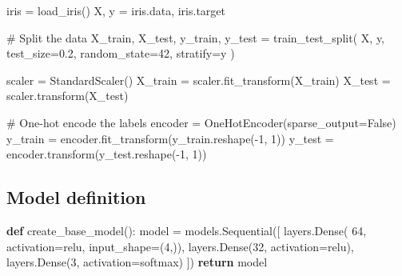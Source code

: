 \documentclass[
]{IEEEtran}
\newenvironment{Shaded}{\begin{snugshade}}{\end{snugshade}}
\newcommand{\CommentTok}[1]{\textcolor[rgb]{0.37,0.37,0.37}{#1}}
\newcommand{\ControlFlowTok}[1]{\textcolor[rgb]{0.00,0.23,0.31}{\textbf{#1}}}
\newcommand{\DecValTok}[1]{\textcolor[rgb]{0.68,0.00,0.00}{#1}}
\newcommand{\FloatTok}[1]{\textcolor[rgb]{0.68,0.00,0.00}{#1}}
\newcommand{\KeywordTok}[1]{\textcolor[rgb]{0.00,0.23,0.31}{\textbf{#1}}}
\newcommand{\NormalTok}[1]{\textcolor[rgb]{0.00,0.23,0.31}{#1}}
\newcommand{\OperatorTok}[1]{\textcolor[rgb]{0.37,0.37,0.37}{#1}}
\newcommand{\StringTok}[1]{\textcolor[rgb]{0.13,0.47,0.30}{#1}}
\newcommand{\VariableTok}[1]{\textcolor[rgb]{0.07,0.07,0.07}{#1}}
\begin{document}
\begin{Shaded}
\begin{Highlighting}[]
\NormalTok{iris }\OperatorTok{=}\NormalTok{ load\_iris()}
\NormalTok{X, y }\OperatorTok{=}\NormalTok{ iris.data, iris.target}

\CommentTok{\# Split the data}
\NormalTok{X\_train, X\_test, y\_train, y\_test }\OperatorTok{=}\NormalTok{ train\_test\_split(}
\NormalTok{  X, y, test\_size}\OperatorTok{=}\FloatTok{0.2}\NormalTok{,}
\NormalTok{  random\_state}\OperatorTok{=}\DecValTok{42}\NormalTok{, stratify}\OperatorTok{=}\NormalTok{y}
\NormalTok{)}

\NormalTok{scaler }\OperatorTok{=}\NormalTok{ StandardScaler()}
\NormalTok{X\_train }\OperatorTok{=}\NormalTok{ scaler.fit\_transform(X\_train)}
\NormalTok{X\_test }\OperatorTok{=}\NormalTok{ scaler.transform(X\_test)}

\CommentTok{\# One{-}hot encode the labels}
\NormalTok{encoder }\OperatorTok{=}\NormalTok{ OneHotEncoder(sparse\_output}\OperatorTok{=}\VariableTok{False}\NormalTok{)}
\NormalTok{y\_train }\OperatorTok{=}\NormalTok{ encoder.fit\_transform(y\_train.reshape(}\OperatorTok{{-}}\DecValTok{1}\NormalTok{, }\DecValTok{1}\NormalTok{))}
\NormalTok{y\_test }\OperatorTok{=}\NormalTok{ encoder.transform(y\_test.reshape(}\OperatorTok{{-}}\DecValTok{1}\NormalTok{, }\DecValTok{1}\NormalTok{))}
\end{Highlighting}
\end{Shaded}

\subsection{Model definition}\label{model-definition}

\begin{Shaded}
\begin{Highlighting}[]
\KeywordTok{def}\NormalTok{ create\_base\_model():}
\NormalTok{    model }\OperatorTok{=}\NormalTok{ models.Sequential([}
\NormalTok{        layers.Dense(}
          \DecValTok{64}\NormalTok{, activation}\OperatorTok{=}\StringTok{\textquotesingle{}relu\textquotesingle{}}\NormalTok{,}
\NormalTok{          input\_shape}\OperatorTok{=}\NormalTok{(}\DecValTok{4}\NormalTok{,)),}
\NormalTok{        layers.Dense(}\DecValTok{32}\NormalTok{, activation}\OperatorTok{=}\StringTok{\textquotesingle{}relu\textquotesingle{}}\NormalTok{),}
\NormalTok{        layers.Dense(}\DecValTok{3}\NormalTok{, activation}\OperatorTok{=}\StringTok{\textquotesingle{}softmax\textquotesingle{}}\NormalTok{)}
\NormalTok{    ])}
    \ControlFlowTok{return}\NormalTok{ model}
\end{Highlighting}
\end{Shaded}
\end{document}
